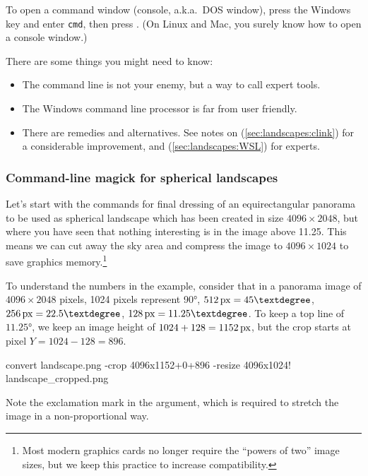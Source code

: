 To open a command window (console, a.k.a.\ DOS window), press the
Windows key and enter \texttt{cmd}, then press \key{\return}. (On Linux and Mac, you
surely know how to open a console window.)

There are some  things you might need to know:
\begin{itemize}
\item The command line is not your enemy, but a way to call expert tools.
\item The Windows command line processor  is far from user friendly.
\item There are remedies and alternatives. See notes on  (\ref{sec:landscapes:clink})
  for a considerable improvement, and  (\ref{sec:landscapes:WSL}) for experts.
\end{itemize}



\subsubsection{Command-line magick for spherical landscapes}
\label{sec:landscapes:ImageMagic:spherical}

Let's start with the commands for final dressing of an equirectangular
panorama to be used as spherical landscape which has been created in
size $4096\times2048$, but where you have seen that nothing interesting
is in the image above 11.25\degree. This means we can cut away the sky area
and compress the image to $4096\times1024$ to save graphics memory.\footnote{Most
modern graphics cards no longer require the ``powers of two''
image sizes, but we keep this practice to increase compatibility.}

To understand the numbers in the example, consider that in a panorama
image of $4096\times2048$ pixels, 1024 pixels represent 90°,
$512\px=45°$, $256\px=22.5°$, $128\px=11.25°$. To keep a top
line of $11.25°$, we keep an image height of $1024+128=1152\,\mathrm{px}$, but the crop starts at pixel $Y=1024-128=896$.

\begin{commands}
convert landscape.png -crop 4096x1152+0+896
        -resize 4096x1024! landscape_cropped.png
\end{commands}
%
Note the exclamation mark in the  argument, which is required to
stretch the image in a non-proportional way.

